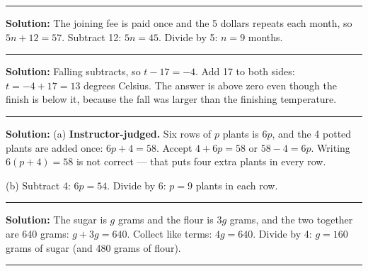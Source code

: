 \documentclass[12pt]{article}
\begin{document}
\vspace{0.25cm}\noindent\rule{\linewidth}{0.2pt}\vspace{0.25cm}


\textbf{Solution:} The joining fee is paid once and the 5 dollars repeats each
month, so $5n + 12 = 57$. Subtract 12: $5n = 45$. Divide by 5: $n = 9$
months. 

\vspace{0.25cm}\noindent\rule{\linewidth}{0.2pt}\vspace{0.25cm}


\textbf{Solution:} Falling subtracts, so $t - 17 = -4$. Add 17 to both sides:
$t = -4 + 17 = 13$ degrees Celsius. The answer is above zero even though the
finish is below it, because the fall was larger than the finishing
temperature. 

\vspace{0.25cm}\noindent\rule{\linewidth}{0.2pt}\vspace{0.25cm}


\textbf{Solution:} (a) \textbf{Instructor-judged.} Six rows of $p$ plants is
$6p$, and the 4 potted plants are added once: $6p + 4 = 58$. Accept
$4 + 6p = 58$ or $58 - 4 = 6p$. Writing $6(p + 4) = 58$ is not correct --- that
puts four extra plants in every row.

(b) Subtract 4: $6p = 54$. Divide by 6: $p = 9$ plants in each
row. 

\vspace{0.25cm}\noindent\rule{\linewidth}{0.2pt}\vspace{0.25cm}


\textbf{Solution:} The sugar is $g$ grams and the flour is $3g$ grams, and the
two together are 640 grams: $g + 3g = 640$. Collect like terms:
$4g = 640$. Divide by 4: $g = 160$ grams of sugar (and 480 grams of
flour). 

\vspace{0.25cm}\noindent\rule{\linewidth}{0.2pt}\vspace{0.25cm}

\end{document}
